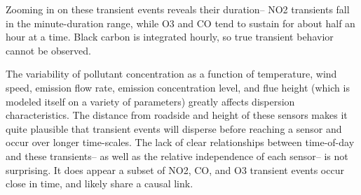 Zooming in on these transient events reveals their duration-- NO2 transients fall in the minute-duration range, while O3 and CO tend to sustain for about half an hour at a time.  Black carbon is integrated hourly, so true transient behavior cannot be observed.  

The variability of pollutant concentration as a function of temperature, wind speed, emission flow rate, emission concentration level,  and flue height (which is modeled itself on a variety of parameters) greatly affects dispersion characteristics.  The distance from roadside and height of these sensors makes it quite plausible that transient events will disperse before reaching a sensor and occur over longer time-scales.  The lack of clear relationships between time-of-day and these transients-- as well as the relative independence of each sensor-- is not surprising.  It does appear a subset of NO2, CO, and O3 transient events occur close in time, and likely share a causal link.  



